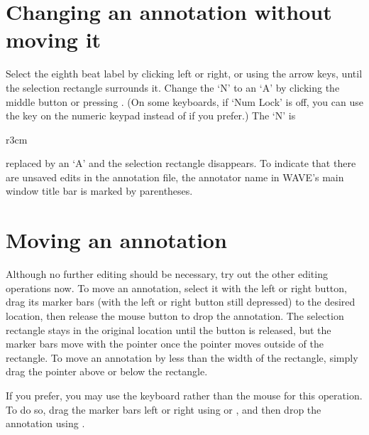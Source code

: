 \documentclass[twoside]{book}
\newcommand{\keycap}[1]{\cornersize{.5}\Ovalbox{\small\sf #1}}
\newcommand{\WAVE}{{\sf WAVE}\xspace}
\begin{document}
\section{Changing an annotation without moving it}

Select the eighth beat label by clicking left or right, or using the
arrow keys, until the selection rectangle surrounds it.  Change the
`{\sf N}' to an `{\sf A}' by clicking the middle button or pressing
\keycap{F2}.
(On some keyboards, if `Num Lock' is off, you can use the \keycap{5} key on
the numeric keypad instead of \keycap{F2} if you prefer.)  The `{\sf N}' is
\begin{wrapfigure}[4]{r}{3cm}
\mbox{}
\begin{htmlonly}
\end{htmlonly}
\begin{latexonly}
\end{latexonly}
\end{wrapfigure}
replaced by an `{\sf A}' and the selection rectangle disappears.  To
indicate that there are unsaved edits in the annotation file, the
annotator name in \WAVE{}'s main window title bar is marked by
parentheses.

\section{Moving an annotation}

Although no further editing should be necessary, try out the other editing
operations now.  To move an annotation, select it with the left or right
button, drag its marker bars (with the left or right button still depressed)
to the desired location, then release the mouse button to drop the annotation.
The selection rectangle stays in the original location
until the button is released, but the marker bars move with the pointer once
the pointer moves outside of the rectangle.  To move an annotation by less than
the width of the rectangle, simply drag the pointer above or below the
rectangle.

If you prefer, you may use the keyboard rather than the mouse for this
operation.  To do so, drag the marker bars left or right using
\keycap{F3} or \keycap{F4}, and then drop the annotation using \keycap{F2}.
\end{document}
